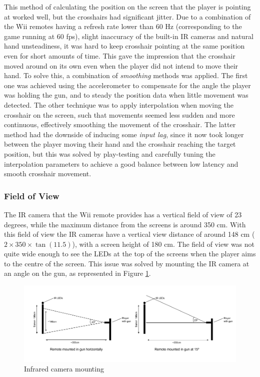 \documentclass[a4paper,11pt]{article}
\begin{document}
This method of calculating the position on the screen that the player is pointing at worked well, but the crosshairs had significant jitter. Due to a combination of the Wii remotes having a refresh rate lower than 60 Hz (corresponding to the game running at 60 fps), slight inaccuracy of the built-in IR cameras and natural hand unsteadiness, it was hard to keep crosshair pointing at the same position even for short amounts of time. This gave the impression that the crosshair moved around on its own even when the player did not intend to move their hand. To solve this, a combination of \emph{smoothing} methods was applied. The first one was achieved using the accelerometer to compensate for the angle the player was holding the gun, and to steady the position data when little movement was detected. The other technique was to apply interpolation when moving the crosshair on the screen, such that movements seemed less sudden and more continuous, effectively smoothing the movement of the crosshair. The latter method had the downside of inducing some \emph{input lag}, since it now took longer between the player moving their hand and the crosshair reaching the target position, but this was solved by play-testing and carefully tuning the interpolation parameters to achieve a good balance between low latency and smooth crosshair movement.

\subsubsection{Field of View}
The IR camera that the Wii remote provides has a vertical field of view of 23 degrees, while the maximum distance from the screens is around 350 cm. With this field of view the IR cameras have a vertical view distance of around 148 cm ($2 \times 350 \times \tan(11.5)$), with a screen height of 180 cm. The field of view was not quite wide enough to see the LEDs at the top of the screens when the player aims to the centre of the screen. This issue was solved by mounting the IR camera at an angle on the gun, as represented in Figure \ref{fig:ir_mounting}.

\begin{figure}
	\centering
	\includegraphics[scale=0.5]{ir}
    \caption{Infrared camera mounting}
    \label{fig:ir_mounting}
\end{figure}
\end{document}
